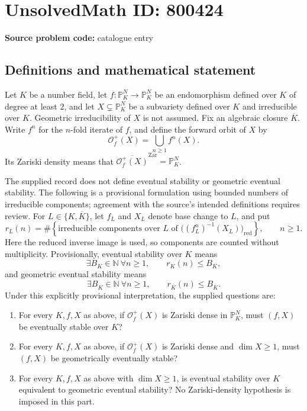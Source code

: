 \documentclass[11pt]{article}
\begin{document}
\section*{UnsolvedMath ID: 800424}
\textbf{Source problem code:} catalogue entry
\subsection{Definitions and mathematical statement}
Let \(K\) be a number field, let \(f:\mathbb{P}^N_K\to\mathbb{P}^N_K\) be an endomorphism defined over \(K\) of degree at least \(2\), and let \(X\subsetneq\mathbb{P}^N_K\) be a subvariety defined over \(K\) and irreducible over \(K\). Geometric irreducibility of \(X\) is not assumed. Fix an algebraic closure \(\overline K\). Write \(f^n\) for the \(n\)-fold iterate of \(f\), and define the forward orbit of \(X\) by
\[
\mathcal O_f^+(X)=\bigcup_{n\geq 1}f^n(X).
\]
Its Zariski density means that \(\overline{\mathcal O_f^+(X)}^{\mathrm{Zar}}=\mathbb P^N_K\).

The supplied record does not define eventual stability or geometric eventual stability. The following is a provisional formulation using bounded numbers of irreducible components; agreement with the source's intended definitions requires review. For \(L\in\{K,\overline K\}\), let \(f_L\) and \(X_L\) denote base change to \(L\), and put
\[
r_L(n)=\#\left\{\text{irreducible components over }L\text{ of }\bigl((f_L^n)^{-1}(X_L)\bigr)_{\mathrm{red}}\right\},\qquad n\geq 1.
\]
Here the reduced inverse image is used, so components are counted without multiplicity. Provisionally, eventual stability over \(K\) means
\[
\exists B_K\in\mathbb N\ \forall n\geq 1,\qquad r_K(n)\leq B_K,
\]
and geometric eventual stability means
\[
\exists B_{\overline K}\in\mathbb N\ \forall n\geq 1,\qquad r_{\overline K}(n)\leq B_{\overline K}.
\]
Under this explicitly provisional interpretation, the supplied questions are:
\begin{enumerate}
\item[(a)] For every \(K,f,X\) as above, if \(\mathcal O_f^+(X)\) is Zariski dense in \(\mathbb P^N_K\), must \((f,X)\) be eventually stable over \(K\)?
\item[(b)] For every \(K,f,X\) as above, if \(\mathcal O_f^+(X)\) is Zariski dense and \(\dim X\geq 1\), must \((f,X)\) be geometrically eventually stable?
\item[(c)] For every \(K,f,X\) as above with \(\dim X\geq 1\), is eventual stability over \(K\) equivalent to geometric eventual stability? No Zariski-density hypothesis is imposed in this part.
\end{enumerate}
\end{document}
